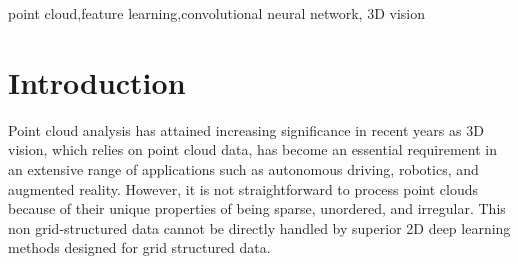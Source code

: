\documentclass[preprint,12pt]{elsarticle}
\begin{document}
\begin{frontmatter}
\begin{comment}
\begin{abstract}
Despite the remarkable success of deep learning, optimal convolution operation on point cloud remains indefinite due to its irregular data structure. In this paper, we present multidimensional kernel Convolution (MKConv) that learns to voxelize the features of local points by exploiting both continuous and discrete convolutions. Our continuous convolution uniquely employs a 3D cubic form of kernel weight representation that splits a feature into voxels in embedding space. By consecutively applying discrete 3D convolutions on the multidimensional features in a spatial manner, preceding continuous convolution is forced to learn spatial feature mapping, i.e., feature voxelization. In this way, geometric information can be detailed by encoding with subdivided features, and our 3D convolutions on these fixed structured data do not suffer from discretization artifacts thanks to voxelization in embedding space. Furthermore, we propose a spatial attention module, Local Set Attention (MLA), to provide comprehensive structure awareness within the local point set and hence produce representative features. By learning feature voxelization with MLA, MKConv can extract enriched features for effective point cloud analysis. We show that MKConv has great applicability to point cloud processing tasks including object classification, object part segmentation, and scene semantic segmentation with state-of-the-art results.
\end{abstract}
\end{comment}
\begin{keyword}
point cloud\sep feature learning\sep convolutional neural network, 3D vision
\end{keyword}
\end{frontmatter}
\section{Introduction}
Point cloud analysis has attained increasing significance in recent years as 3D vision, which relies on point cloud data, has become an essential requirement in an extensive range of applications such as autonomous driving, robotics, and augmented reality. However, it is not straightforward to process point clouds because of their unique properties of being sparse, unordered, and irregular. This non grid-structured data cannot be directly handled by superior 2D deep learning methods designed for grid structured data. 
\end{document}
